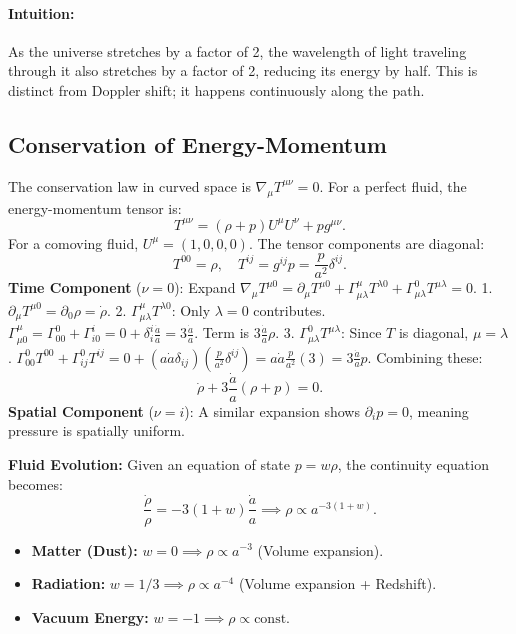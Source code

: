 \documentclass[11pt, a4paper]{report}
\begin{document}
\paragraph{Intuition:} As the universe stretches by a factor of 2, the wavelength of light traveling through it also stretches by a factor of 2, reducing its energy by half. This is distinct from Doppler shift; it happens continuously along the path.

\subsection*{Conservation of Energy-Momentum}
The conservation law in curved space is \(\nabla_\mu T^{\mu\nu} = 0\). For a perfect fluid, the energy-momentum tensor is:
\begin{equation}
T^{\mu\nu} = (\rho + p)U^\mu U^\nu + p g^{\mu\nu}.
\end{equation}
For a comoving fluid, \(U^\mu = (1, 0, 0, 0)\). The tensor components are diagonal:
\begin{equation}
T^{00} = \rho, \quad T^{ij} = g^{ij} p = \frac{p}{a^2} \delta^{ij}.
\end{equation}
\textbf{Time Component} (\(\nu=0\)):
Expand \(\nabla_\mu T^{\mu 0} = \partial_\mu T^{\mu 0} + \Gamma^\mu_{\mu\lambda} T^{\lambda 0} + \Gamma^0_{\mu\lambda} T^{\mu\lambda} = 0\).
1. \(\partial_\mu T^{\mu 0} = \partial_0 \rho = \dot{\rho}\).
2. \(\Gamma^\mu_{\mu\lambda} T^{\lambda 0}\): Only \(\lambda=0\) contributes.
   \(\Gamma^\mu_{\mu 0} = \Gamma^0_{00} + \Gamma^i_{i 0} = 0 + \delta^i_i \frac{\dot{a}}{a} = 3\frac{\dot{a}}{a}\).
   Term is \(3\frac{\dot{a}}{a} \rho\).
3. \(\Gamma^0_{\mu\lambda} T^{\mu\lambda}\): Since \(T\) is diagonal, \(\mu=\lambda\).
   \(\Gamma^0_{00} T^{00} + \Gamma^0_{ij} T^{ij} = 0 + (a\dot{a} \delta_{ij}) (\frac{p}{a^2} \delta^{ij}) = a\dot{a} \frac{p}{a^2} (3) = 3\frac{\dot{a}}{a} p\).
Combining these:
\begin{equation}
\dot{\rho} + 3\frac{\dot{a}}{a} (\rho + p) = 0.
\end{equation}
\textbf{Spatial Component} (\(\nu=i\)):
A similar expansion shows \(\partial_i p = 0\), meaning pressure is spatially uniform.

\textbf{Fluid Evolution:}
Given an equation of state \(p = w\rho\), the continuity equation becomes:
\begin{equation}
\frac{\dot{\rho}}{\rho} = -3(1+w) \frac{\dot{a}}{a} \implies \rho \propto a^{-3(1+w)}.
\end{equation}
\begin{itemize}
    \item \textbf{Matter (Dust):} \(w=0 \implies \rho \propto a^{-3}\) (Volume expansion).
    \item \textbf{Radiation:} \(w=1/3 \implies \rho \propto a^{-4}\) (Volume expansion + Redshift).
    \item \textbf{Vacuum Energy:} \(w=-1 \implies \rho \propto \text{const}\).
\end{itemize}
\end{document}
